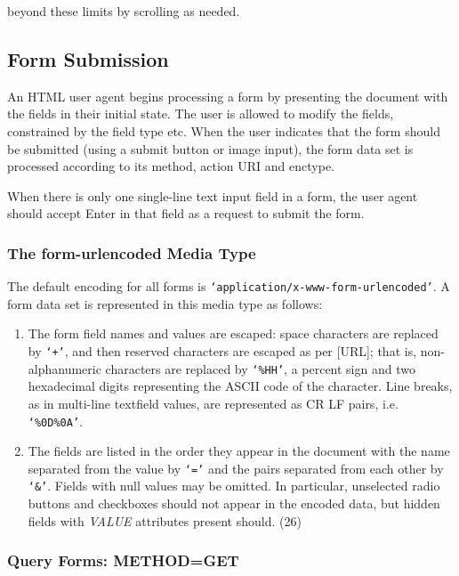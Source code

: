 beyond these limits by scrolling as needed.
\par \subsection*{Form Submission}\par 
An HTML user agent begins processing a form by presenting the
document with the fields in their initial state.  The user is allowed
to modify the fields, constrained by the field type etc.  When the user
indicates that the form should be submitted (using a submit button or
image input), the form data set is processed according to its method,
action URI and enctype.
\par \par 
When there is only one single-line text input field in a form, the
user agent should accept Enter in that field as a request to submit
the form.
\par \subsubsection*{The form-urlencoded Media Type}\par 
The default encoding for all forms is
{\tt `application/x-www-form-urlencoded'}.  A form data set is
represented in this media type as follows:
\par \begin{enumerate}\item 
The form field names and values are escaped:  space characters are
replaced by {\tt `+'}, and then reserved characters are escaped as per
[URL];  that is, non-alphanumeric characters are replaced by
{\tt `\%HH'}, a percent sign and two hexadecimal digits representing the
ASCII code of the character.  Line breaks, as in multi-line textfield
values, are represented as CR LF pairs, i.e.  {\tt `\%0D\%0A'}.
\item 
The fields are listed in the order they appear in the document
with the name separated from the value by {\tt `='} and the pairs
separated from each other by {\tt `\&'}.  Fields with null values may be
omitted.  In particular, unselected radio buttons and checkboxes should
not appear in the encoded data, but hidden fields with {\it VALUE}
attributes present should.
(26)\end{enumerate}\subsubsection*{Query Forms:  METHOD=GET}\par 

